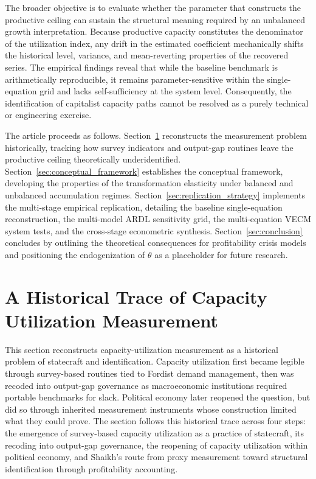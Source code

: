 \documentclass[11pt]{article}
\begin{document}
The broader objective is to evaluate whether the parameter that constructs the productive ceiling can sustain the structural meaning required by an unbalanced growth interpretation. Because productive capacity constitutes the denominator of the utilization index, any drift in the estimated coefficient mechanically shifts the historical level, variance, and mean-reverting properties of the recovered series. The empirical findings reveal that while the baseline benchmark is arithmetically reproducible, it remains parameter-sensitive within the single-equation grid and lacks self-sufficiency at the system level. Consequently, the identification of capitalist capacity paths cannot be resolved as a purely technical or engineering exercise.

The article proceeds as follows. Section~\ref{sec:literature_review} reconstructs the measurement problem historically, tracking how survey indicators and output-gap routines leave the productive ceiling theoretically underidentified. Section~\ref{sec:conceptual_framework} establishes the conceptual framework, developing the properties of the transformation elasticity under balanced and unbalanced accumulation regimes. Section~\ref{sec:replication_strategy} implements the multi-stage empirical replication, detailing the baseline single-equation reconstruction, the multi-model ARDL sensitivity grid, the multi-equation VECM system tests, and the cross-stage econometric synthesis. Section~\ref{sec:conclusion} concludes by outlining the theoretical consequences for profitability crisis models and positioning the endogenization of $\theta$ as a placeholder for future research.

\section{A Historical Trace of Capacity Utilization Measurement}
\label{sec:literature_review}

This section reconstructs capacity-utilization measurement as a historical problem of statecraft and identification. Capacity utilization first became legible through survey-based routines tied to Fordist demand management, then was recoded into output-gap governance as macroeconomic institutions required portable benchmarks for slack. Political economy later reopened the question, but did so through inherited measurement instruments whose construction limited what they could prove. The section follows this historical trace across four steps: the emergence of survey-based capacity utilization as a practice of statecraft, its recoding into output-gap governance, the reopening of capacity utilization within political economy, and Shaikh's route from proxy measurement toward structural identification through profitability accounting.
\end{document}
